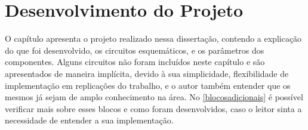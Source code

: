\chapter[Desenvolvimento do Projeto]{Desenvolvimento do Projeto}

O capítulo apresenta o projeto realizado nessa dissertação, contendo a explicação do que foi desenvolvido, os circuitos esquemáticos, e os parâmetros dos componentes. Alguns circuitos não foram incluídos neste capítulo e são apresentados de maneira implícita, devido à sua simplicidade, flexibilidade de implementação em replicações do trabalho, e o autor também entender que os mesmos já sejam de amplo conhecimento na área. No \autoref{blocosadicionais} é possível verificar mais sobre esses blocos e como foram desenvolvidos, caso o leitor sinta a necessidade de entender a sua implementação.

\newcommand{\NomeBloco}{NULL}
\newcommand{\NomeBlocoNoIt}{NULL}
\newcommand{\NomeBlocoNoUnderline}{NULL}
\newcommand{\NomePTab}{tab_\NomeBlocoNoUnderline}
\newcommand{\NomeSTab}{tab_\NomeBlocoNoUnderline2}
\newcommand{\NomePFig}{fig_\NomeBlocoNoUnderline}
\newcommand{\NomeSFig}{fig_\NomeBlocoNoUnderline2}
\newcommand{\NomeTTab}{tab_\NomeBlocoNoUnderline3}
\newcommand{\NomeQTab}{tab_\NomeBlocoNoUnderline4}











